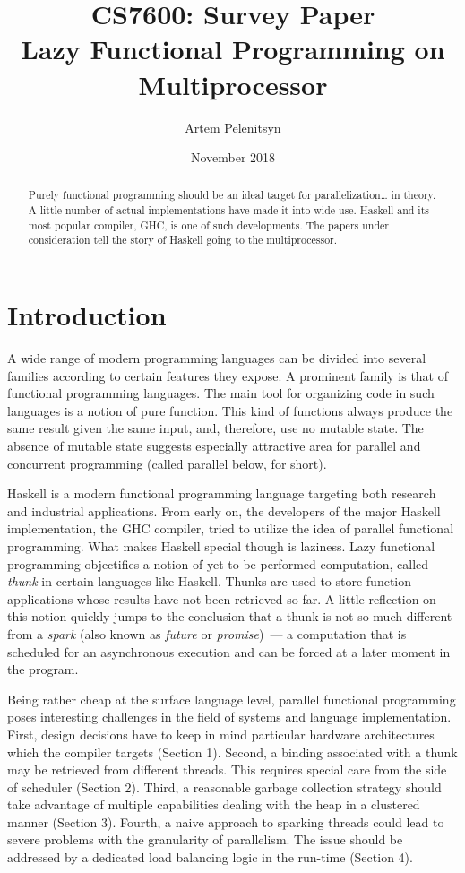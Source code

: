 \documentclass[11pt]{extarticle}
\title{CS7600: Survey Paper\\Lazy Functional Programming on Multiprocessor}
\author{Artem Pelenitsyn}
\date{November 2018}
\begin{document}
\maketitle

\begin{abstract}
Purely functional programming should be an ideal target for parallelization… in theory. A little number of actual implementations have made it into wide use. Haskell and its most popular compiler, GHC, is one of such developments. The papers under consideration tell the story of Haskell going to the multiprocessor.
\end{abstract}


\nocite{*}



\section{Introduction}

A wide range of modern programming languages can be divided into several families according to certain features they expose. A prominent family is that of functional programming languages. The main tool for organizing code in such languages is a notion of pure function. This kind of functions always produce the same result given the same input, and, therefore, use no mutable state. The absence of mutable state suggests especially attractive area for parallel and concurrent programming (called parallel below, for short).

Haskell is a modern functional programming language targeting both research and industrial applications. From early on, the developers of the major Haskell implementation, the GHC compiler, tried to utilize the idea of parallel functional programming. What makes Haskell special though is laziness. Lazy functional programming objectifies a notion of yet-to-be-performed computation, called \emph{thunk} in certain languages like Haskell. Thunks are used to store function applications whose results have not been retrieved so far. A little reflection on this notion quickly jumps to the conclusion that a thunk is not so much different from a \emph{spark} (also known as \emph{future} or \emph{promise})~--- a computation that is scheduled for an asynchronous execution and can be forced at a later moment in the program.

Being rather cheap at the surface language level, parallel functional programming poses interesting challenges in the field of systems and language implementation. First, design decisions have to keep in mind particular hardware architectures which the compiler targets (Section 1). Second, a binding associated with a thunk may be retrieved from different threads. This requires special care from the side of scheduler (Section 2). Third, a reasonable garbage collection strategy should take advantage of multiple capabilities dealing with the heap in a clustered manner (Section 3). Fourth, a naive approach to sparking threads could lead to severe problems with the granularity of parallelism. The issue should be addressed by a dedicated load balancing logic in the run-time (Section 4).
\end{document}
